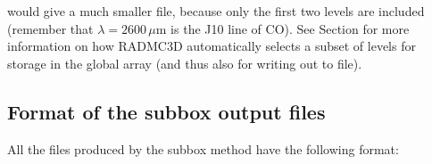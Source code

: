 \documentclass[letterpaper,10pt,english]{sphinxmanual}
\begin{document}
\begin{sphinxVerbatim}[commandchars=\\\{\}]
               
\end{sphinxVerbatim}

would give a much smaller  file, because only the
first two levels are included (remember that \(\lambda=2600\,\mu\)m is the
J1\sphinxhyphen{}0 line of CO). See Section {\hyperref[\detokenize{lineradtrans:sec-calcstore-levpop}]{}} for more information
on how RADMC\sphinxhyphen{}3D automatically selects a subset of levels for storage in the
global array (and thus also for writing out to file).


\subsection{Format of the subbox output files}
\label{\detokenize{toolsinside:format-of-the-subbox-output-files}}\label{\detokenize{toolsinside:sec-subbox-file-format}}
All the files produced by the subbox method have the following format:
\end{document}
